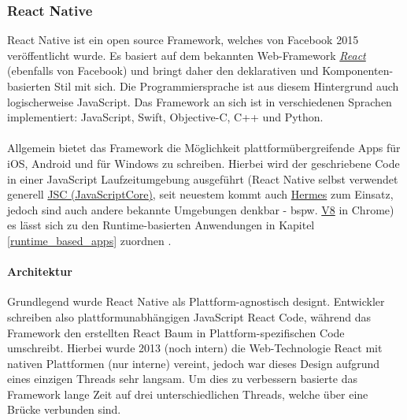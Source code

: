 \subsubsection{React Native}
\label{react-native}
React Native ist ein open source Framework, welches von Facebook 2015 veröffentlicht wurde. 
Es basiert auf dem bekannten Web-Framework \href{https://reactjs.org/}{\textit{React}} (ebenfalls von Facebook) und bringt daher den deklarativen und Komponenten-basierten Stil mit sich. 
Die Programmiersprache ist aus diesem Hintergrund auch logischerweise JavaScript.
Das Framework an sich ist in verschiedenen Sprachen implementiert: JavaScript, Swift, Objective-C, C++ und Python.\\
\\
Allgemein bietet das Framework die Möglichkeit plattformübergreifende Apps für iOS, Android und für Windows zu schreiben. Hierbei wird der geschriebene Code in einer JavaScript Laufzeitumgebung ausgeführt (React Native selbst verwendet generell \href{https://trac.webkit.org/wiki/JavaScriptCore}{JSC (JavaScriptCore)}, seit neuestem kommt auch \href{https://hermesengine.dev/}{Hermes} zum Einsatz, jedoch sind auch andere bekannte Umgebungen denkbar - bspw. \href{https://v8.dev/}{V8} in Chrome) es lässt sich zu den Runtime-basierten Anwendungen in Kapitel \ref{runtime_based_apps} zuordnen \cite{reactnative2021}.\\
\paragraph{Architektur}
Grundlegend wurde React Native als Plattform-agnostisch designt. Entwickler schreiben also plattformunabhängigen JavaScript React Code, während das Framework den erstellten React Baum in Plattform-spezifischen Code umschreibt. Hierbei wurde 2013 (noch intern) die Web-Technologie React mit nativen Plattformen (nur interne) vereint, jedoch war dieses Design aufgrund eines einzigen Threads sehr langsam. Um dies zu verbessern basierte das Framework lange Zeit auf drei unterschiedlichen Threads, welche über eine Brücke verbunden sind.

